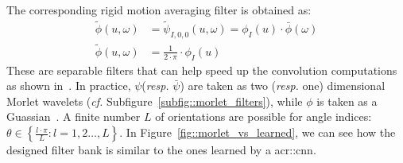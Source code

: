                     The corresponding rigid motion averaging filter is obtained as:
                    \begin{align}
                        \label{eq::roto-translation_low_pass}
                        \tilde{\phi}(u, \omega) &= \tilde{\psi}_{I, 0, 0}(u, \omega) = \phi_I(u) \cdot \bar\phi(\omega) \nonumber \\
                        \tilde{\phi}(u, \omega) &= \frac{1}{2\cdot\pi} \cdot \phi_I(u)
                    \end{align}
                    These are separable filters that can help speed up the convolution computations as shown in~\textcite{sifre2013rotation}.
                    In practice, $\psi$(\textit{resp.} $\bar\psi$) are taken as two (\textit{resp.} one) dimensional Morlet wavelets (\textit{cf.} Subfigure~\ref{subfig::morlet_filters}), while $\phi$ is taken as a Guassian~\parencite{oyallon2015deep,sifre2013rotation,bruna2013invariant}.
                    A finite number $L$ of orientations are possible for angle indices: $\theta \in \left\{\frac{l\cdot\pi}{L}: l=1,2\dots,L\right\}$.
                    In Figure~\ref{fig::morlet_vs_learned}, we can see how the designed filter bank is similar to the ones learned by a \gls{acr::cnn}.
